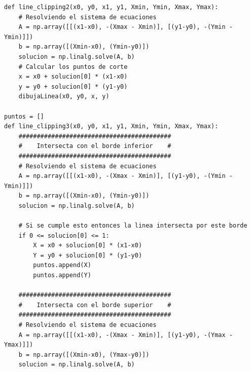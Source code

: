 \documentclass[a4paper]{article}
\begin{document}
\begin{center}
\begin{mycodeboxl}
\begin{lstlisting}
def line_clipping2(x0, y0, x1, y1, Xmin, Ymin, Xmax, Ymax):
    # Resolviendo el sistema de ecuaciones
    A = np.array([[(x1-x0), -(Xmax - Xmin)], [(y1-y0), -(Ymin - Ymin)]])
    b = np.array([(Xmin-x0), (Ymin-y0)])
    solucion = np.linalg.solve(A, b)
    # Calcular los puntos de corte
    x = x0 + solucion[0] * (x1-x0)
    y = y0 + solucion[0] * (y1-y0)
    dibujaLinea(x0, y0, x, y)

puntos = []
def line_clipping3(x0, y0, x1, y1, Xmin, Ymin, Xmax, Ymax):
    ##########################################
    #    Intersecta con el borde inferior    #
    ##########################################
    # Resolviendo el sistema de ecuaciones
    A = np.array([[(x1-x0), -(Xmax - Xmin)], [(y1-y0), -(Ymin - Ymin)]])
    b = np.array([(Xmin-x0), (Ymin-y0)])
    solucion = np.linalg.solve(A, b)

    # Si se cumple esto entonces la linea intersecta por este borde 
    if 0 <= solucion[0] <= 1:
        X = x0 + solucion[0] * (x1-x0)
        Y = y0 + solucion[0] * (y1-y0)
        puntos.append(X)
        puntos.append(Y)

    ##########################################
    #    Intersecta con el borde superior    #
    ##########################################
    # Resolviendo el sistema de ecuaciones
    A = np.array([[(x1-x0), -(Xmax - Xmin)], [(y1-y0), -(Ymax - Ymax)]])
    b = np.array([(Xmin-x0), (Ymax-y0)])
    solucion = np.linalg.solve(A, b)
\end{lstlisting}
\end{mycodeboxl}
\end{center}
\newpage
\end{document}
